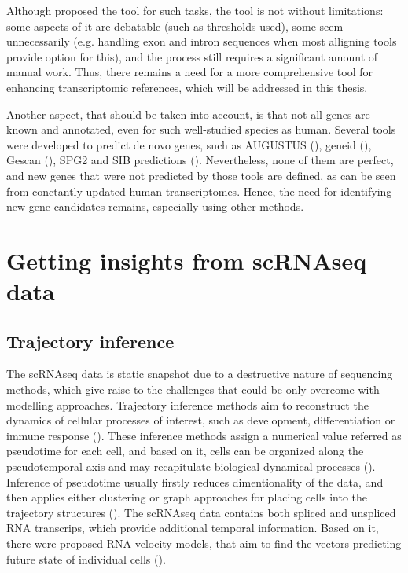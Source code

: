 Although \textcite{Pool2023} proposed the tool for such tasks, the tool is not without limitations:
some aspects of it are debatable (such as thresholds used), some seem unnecessarily
(e.g. handling exon and intron sequences when most alligning tools provide option for this),
and the process still requires a significant amount of manual work.
Thus, there remains a need for a more comprehensive tool for enhancing transcriptomic references,
which will be addressed in this thesis.

Another aspect, that should be taken into account, is that not all genes are known and annotated, even for such well-studied species as human.
Several tools were developed to predict de novo genes, such as AUGUSTUS (\cite{Stanke2008}), geneid (\cite{Blanco2007}), Gescan (\cite{Burge1997}),
SPG2 and SIB predictions (\cite{Prediction}).
Nevertheless, none of them are perfect, and new genes that were not predicted by those tools are defined,
as can be seen from conctantly updated human transcriptomes.
Hence, the need for identifying new gene candidates remains, especially using other methods.

\section{Getting insights from scRNAseq data}

\subsection{Trajectory inference}

The scRNAseq data is static snapshot due to a destructive nature of sequencing methods,
which give raise to the challenges that could be only overcome with modelling approaches.
Trajectory inference methods aim to reconstruct the dynamics of cellular processes of interest,
such as development, differentiation or immune response (\cite{Deconinck2021}).
These inference methods assign a numerical value referred as pseudotime for each cell, and based on it,
cells can be organized along the pseudotemporal axis and may recapitulate biological dynamical processes (\cite{Wang2021}).
Inference of pseudotime usually firstly reduces dimentionality of the data, and then applies either clustering or graph approaches
for placing cells into the trajectory structures (\cite{Deconinck2021}).
The scRNAseq data contains both spliced and unspliced RNA transcrips, which provide additional temporal information.
Based on it, there were proposed RNA velocity models, that aim to find the vectors predicting future state of individual cells (\cite{Manno2018}).

